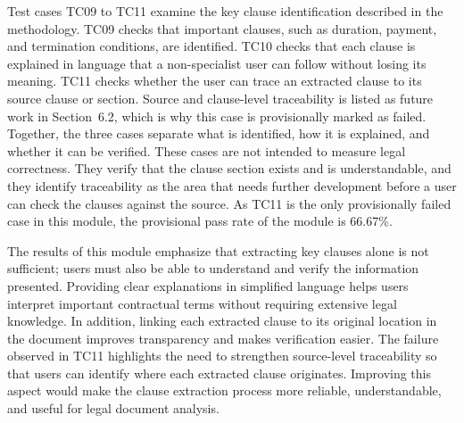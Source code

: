 \documentclass[12pt,a4paper,oneside]{report}
\begin{document}
Test cases TC09 to TC11 examine the key clause identification described in the methodology. TC09 checks that important clauses, such as duration, payment, and termination conditions, are identified. TC10 checks that each clause is explained in language that a non-specialist user can follow without losing its meaning. TC11 checks whether the user can trace an extracted clause to its source clause or section. Source and clause-level traceability is listed as future work in Section~6.2, which is why this case is provisionally marked as failed. Together, the three cases separate what is identified, how it is explained, and whether it can be verified. These cases are not intended to measure legal correctness. They verify that the clause section exists and is understandable, and they identify traceability as the area that needs further development before a user can check the clauses against the source. As TC11 is the only provisionally failed case in this module, the provisional pass rate of the module is 66.67\%.

The results of this module emphasize that extracting key clauses alone is not sufficient; users must also be able to understand and verify the information presented. Providing clear explanations in simplified language helps users interpret important contractual terms without requiring extensive legal knowledge. In addition, linking each extracted clause to its original location in the document improves transparency and makes verification easier. The failure observed in TC11 highlights the need to strengthen source-level traceability so that users can identify where each extracted clause originates. Improving this aspect would make the clause extraction process more reliable, understandable, and useful for legal document analysis.

\end{document}
